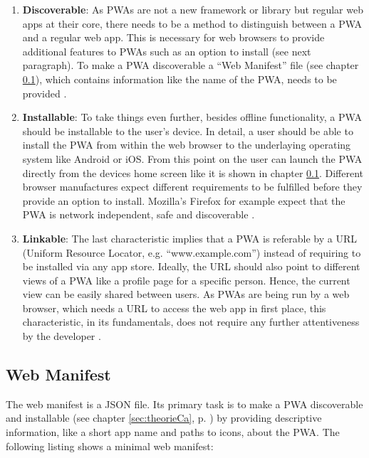 \begin{enumerate}
	\item \textbf{Discoverable}: As  \acs{PWA}s are not a new framework or library but regular web apps at their core, there needs to be a method to distinguish between a  \acs{PWA} and a regular web app. This is necessary for web browsers to provide additional features to  \acs{PWA}s such as an option to install (see next paragraph). To make a  \acs{PWA} discoverable a “Web Manifest” file (see chapter \ref{sec:theorieCb}), which contains information like the name of the  \acs{PWA}, needs to be provided \cite[p. 118]{liebelProgressiveWebApps2019}.

	\item \textbf{Installable}: To take things even further, besides offline functionality, a  \acs{PWA} should be installable to the user’s device. In detail, a user should be able to install the  \acs{PWA} from within the web browser to the underlaying operating system like Android or iOS. From this point on the user can launch the  \acs{PWA} directly from the devices home screen like it is shown in chapter \ref{sec:theorieCb}. Different browser manufactures expect different requirements to be fulfilled before they provide an option to install. Mozilla’s Firefox for example expect that the  \acs{PWA} is network independent, safe and discoverable \cite{HowMakePWAs}.

	\item \textbf{Linkable}: The last characteristic implies that a  \acs{PWA} is referable by a URL (Uniform Resource Locator, e.g. “www.example.com”) instead of requiring to be installed via any app store. Ideally, the URL should also point to different views of a  \acs{PWA} like a profile page for a specific person. Hence, the current view can be easily shared between users. As  \acs{PWA}s are being run by a web browser, which needs a URL to access the web app in first place, this characteristic, in its fundamentals, does not require any further attentiveness by the developer \cite[pp. 126-127]{liebelProgressiveWebApps2019}.
\end{enumerate}

\subsection{Web Manifest}
\label{sec:theorieCb}

The web manifest is a \ac{JSON} file. Its primary task is to make a  \acs{PWA} discoverable and installable (see chapter \ref{sec:theorieCa}, p. \pageref{sec:theorieCa}) by providing descriptive information, like a short app name and paths to icons, about the  \acs{PWA}. 
The following listing shows a minimal web manifest:

